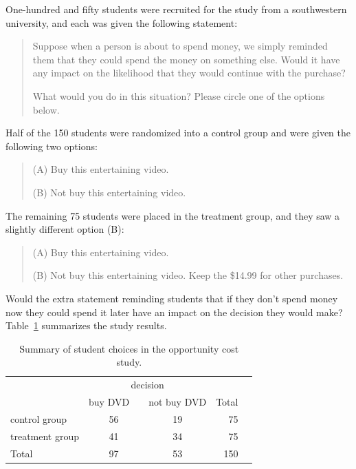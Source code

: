 One-hundred and fifty students were recruited for the study from a southwestern university, and each was given the following statement:
\begin{quote}
Suppose when a person is about to spend money, we simply reminded them that they could spend the money on something else. Would it have any impact on the likelihood that they would continue with the purchase?

What would you do in this situation? Please circle one of the options below.
\end{quote}
Half of the 150 students were randomized into a control group and were given the following two options:
\begin{quote}
(A) Buy this entertaining video.

(B) Not buy this entertaining video.
\end{quote}
The remaining 75 students were placed in the treatment group, and they saw a slightly different option (B):
\begin{quote}
(A) Buy this entertaining video.

(B) Not buy this entertaining video. Keep the \$14.99 for other purchases.
\end{quote}
Would the extra statement reminding students that if they don't spend money now they could spend it later have an impact on the decision they would make? Table~\ref{OpportunityCostTable} summarizes the study results.

\begin{table}[ht]
\centering
\begin{tabular}{l cc rr}
& \multicolumn{2}{c}{decision} \\
\cline{2-3}
				& {buy DVD}\ \  	& {not buy DVD} & Total & \hspace{3mm}  \\ 
\cline{1-4}
control group 		& 56		& 19	& 75 \\ 
treatment group 	& 41		& 34	& 75 \\ 
\cline{1-4}
Total				& 97		& 53	& 150
\end{tabular}
\caption{Summary of student choices in the opportunity cost study.}
\label{OpportunityCostTable}
\end{table}

